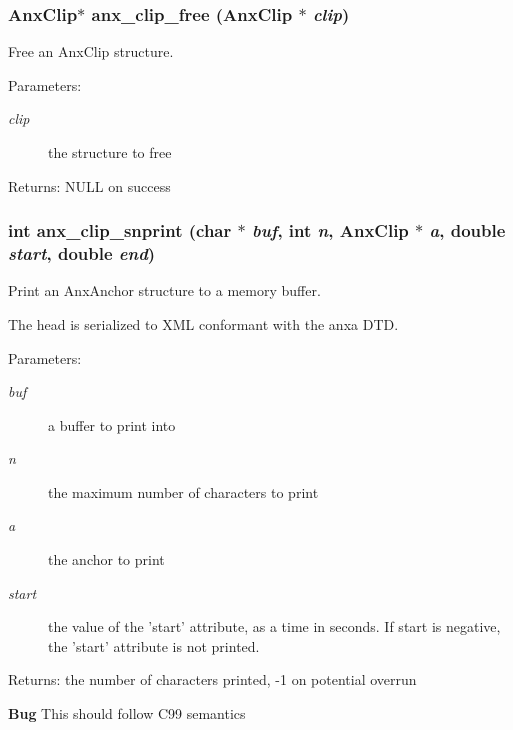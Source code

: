 \subsubsection{\setlength{\rightskip}{0pt plus 5cm}Anx\-Clip$\ast$ anx\_\-clip\_\-free (Anx\-Clip $\ast$ {\em clip})}\label{anx__general_8h_a22}


Free an Anx\-Clip structure. 

\begin{Desc}
\item[Parameters:]
\begin{description}
\item[{\em clip}]the structure to free \end{description}
\end{Desc}
\begin{Desc}
\item[Returns:]NULL on success \end{Desc}
\subsubsection{\setlength{\rightskip}{0pt plus 5cm}int anx\_\-clip\_\-snprint (char $\ast$ {\em buf}, int {\em n}, Anx\-Clip $\ast$ {\em a}, double {\em start}, double {\em end})}\label{anx__general_8h_a20}


Print an Anx\-Anchor structure to a memory buffer. 

The head is serialized to XML conformant with the anxa DTD. \begin{Desc}
\item[Parameters:]
\begin{description}
\item[{\em buf}]a buffer to print into \item[{\em n}]the maximum number of characters to print \item[{\em a}]the anchor to print \item[{\em start}]the value of the 'start' attribute, as a time in seconds. If start is negative, the 'start' attribute is not printed. \end{description}
\end{Desc}
\begin{Desc}
\item[Returns:]the number of characters printed, -1 on potential overrun \end{Desc}
\begin{Desc}
\item[{\bf Bug}]This should follow C99 semantics \end{Desc}
